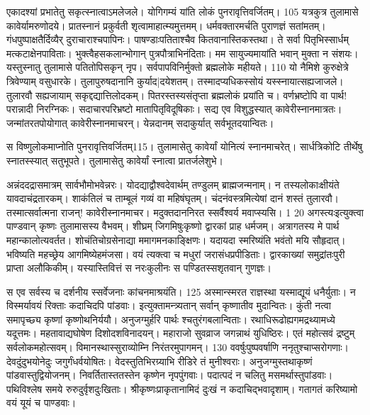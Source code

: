 एकादश्यां प्रभातेतु सकृत्स्नात्वाऽमलेजले।
 योगिगम्यं यांति लोकं पुनरावृत्तिवर्जितम्।
 105 यत्रकुत्र तुलामासे कावेर्यामरुणोदये।
 प्रातस्नानं प्रकुर्वती शृत्वामाहात्म्यमुत्तमम्।
 धर्मवक्तारमर्चति पुराणज्ञं सतांमतम्।
 गंधपुष्पाक्षतैर्दिव्यैर् दुराचाराश्चपापिनः।
 पाषण्डाःपतिताश्चैव कितवानास्तिकस्तथा।
 ते सर्वा पितृभिस्सार्धम् मत्कटाक्षेनपाविताः।
 भुक्त्वैहसकलान्भोगान् पुत्रपौत्राभिनंदिताः।
 मम सायुज्यमायांति भवान् मुक्ता न संशयः।
 यस्तुस्नातु तुलामासे पतितोपिसकृन् नृप।
 सर्वपापविनिर्मुक्तो ब्रह्मलोके महीयते।
 110 यो नैमिशे कुरुक्षेत्रे त्रिवेण्याम् वसुधारके।
 तुलापुरुषदानानि कुर्याद|दयेशतम्।
 तस्मादप्यधिकस्सोयं यस्स्नायात्सह्यजाजले।
 तुलारवौ सह्यजायाम् सकृद्दद्यात्तिलोदकम्।
 पितरस्तस्यसंतृप्ता ब्रह्मलोकं प्रयांति च।
 वर्णभ्रष्टोपि वा पार्थ! परान्नादी निरग्निकः।
 सदाचारपरिभ्रष्टो मातापितृविदूषिकाः।
 सद्य एव विशुद्धस्यात् कावेरीस्नानमात्रतः।
 जन्मांतरतपोयोगात् कावेरीस्नानमाचरन्।
 येन्नदानम् सदाकुर्यात् सर्वभूतदयान्वितः।
 
स विष्णुलोकमाप्नोति पुनरावृत्तिवर्जितम्115।
 तुलामासेतु कावेर्यां योनित्यं स्नानमाचरेत्।
 सार्धत्रिकोटि तीर्थेषु स्नातस्स्यात् सतुभूपते।
 तुलामासेतु कावेर्यां स्नात्वा प्रातर्जलेशुभे।
 
अन्नंददद्रासमात्रम् सार्वभौमोभवेन्नरः।
 योदद्याद्वौश्वदेवार्थम् तण्डुलम् ब्राह्मजन्मनाम्।
 न तस्यलोकाःक्षीयंते यावदाचंद्रतारकम्।
 शाकंतिलं च ताम्बूलं गव्यं वा महिषंघृतम्।
 चंदनंवस्त्रमित्येषां दानं शस्तं तुलारवौ।
 तस्मात्सर्वात्मना राजन्! कावेरीस्नानमाचर।
 मदुक्तदाननिरत स्सर्वैश्वर्य मवाप्स्यसि।
 1 20 अगस्त्यःइत्युक्त्वा पाण्डवान् कृष्णः तुलामासस्य वैभवम्।
 शीघ्रम् जिगमिषुःकृष्णो द्वारकां प्राह धर्मजम्।
 अत्रागतस्य मे पार्थ महान्कालोत्यवर्तत।
 शोचंतिचोग्रसेनाद्या ममागमनकाङ्क्षिणः।
 यदायदा स्मरिष्यंति भवंतो मयि सौहृदात्।
 भविष्यति महच्छ्रेय आगमिष्येहमंजसा।
 वयं त्यक्त्वा च मधुरां जरासंधप्रपीडिताः।
 द्वारकाख्यां समुद्रांतःपुरी प्राप्ता अलौकिकीम्।
 यस्यास्तिवित्तं स नरःकुलीनः
स पण्डितस्सशृतवान् गुणज्ञः।

स एव सर्वस्य च दर्शनीय
स्सर्वेजनाः कांचनमाश्रयंति।
 125 अस्मान्स्मरत राज्ञस्था यस्माद्यूयं धनैर्युताः।
 न विस्मर्यावयं रिक्ताः कदाचिदपि पांडवाः।
 इत्युक्तामन्त्र्यतान् सर्वान् कृष्णातीव मुदान्वितः।
 कुंती नत्वा समापृच्छ्य कृष्णां कृष्णोथनिर्ययौ।
 अनुजग्मुर्हरि पार्थः श्चतुरंगबलान्विताः।
 रथाधिरूढोह्यगमद्रथ्यामध्ये यदूत्तमः।
 महतावाद्यघोषेण दिशोदशविनादयन्।
 महाराजो सुवव्राज जगन्नाथं युधिष्ठिरः।
 एतं महोत्सवं द्रष्टुम् सर्वलोकमहोत्सवम्।
 विमानस्थास्सुराव्योम्नि निरंतरमुपागमन्।
 130 ववर्षुःपुष्पवर्षाणि ननृतुश्चाप्सरोगणाः।
 देवदुंदुभयोनेदुः जगुर्गंधर्वयोषितः।
 वेदस्तुतिभिरग्र्याभि रीडिरे तं मुनीश्वराः।
 अनुजग्मुस्तथाकृष्णं पांडवास्तुद्वियोजनम्।
 निवर्तितास्ततस्तेन कृष्णेन नृपपुंगवाः।
 पदात्पदं न चलितु मसमर्थास्तुपांडवाः।
 पथिविश्लेष समये रुरुदुर्वृशदुःखिताः।
 श्रीकृष्णःप्राकृतानामिदं दुःखं न कदाचिद्भवादृशाम्।
 गतागतं करिष्यामो वयं यूयं च पाण्डवाः।
 
